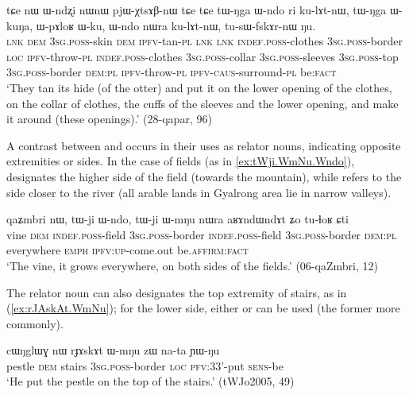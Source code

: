 \begin{exe}
\ex \label{ex:Wndo.ri.kulAtnW}
\gll tɕe nɯ ɯ-ndʐi nɯnɯ pjɯ-χtsɤβ-nɯ tɕe tɕe tɯ-ŋga ɯ-ndo ri ku-lɤt-nɯ, tɯ-ŋga ɯ-kuŋa, ɯ-pɤloʁ ɯ-ku, ɯ-ndo nɯra ku-lɤt-nɯ,  tu-sɯ-fskɤr-nɯ ŋu.   \\
\textsc{lnk} \textsc{dem} \textsc{3sg}.\textsc{poss}-skin \textsc{dem} \textsc{ipfv}-tan-\textsc{pl} \textsc{lnk} \textsc{lnk} \textsc{indef}.\textsc{poss}-clothes \textsc{3sg}.\textsc{poss}-border \textsc{loc} \textsc{ipfv}-throw-\textsc{pl} \textsc{indef}.\textsc{poss}-clothes \textsc{3sg}.\textsc{poss}-collar \textsc{3sg}.\textsc{poss}-sleeves \textsc{3sg}.\textsc{poss}-top \textsc{3sg}.\textsc{poss}-border  \textsc{dem}:\textsc{pl}  \textsc{ipfv}-throw-\textsc{pl} \textsc{ipfv}-\textsc{caus}-surround-\textsc{pl} be:\textsc{fact} \\
\glt `They tan its hide (of the otter) and put it on the lower opening of the clothes, on the collar of clothes, the cuffs of the sleeves and the lower opening, and make it around (these openings).' (28-qapar, 96)
\end{exe} 


A contrast between  and  occurs in their uses as relator nouns, indicating opposite extremities or sides. In the case of fields (as in \ref{ex:tWji.WmNu.Wndo}),  designates the higher side of the field (towards the mountain), while  refers to the side closer to the river (all arable lands in Gyalrong area lie in narrow valleys).

\begin{exe}
\ex \label{ex:tWji.WmNu.Wndo}
\gll  qaʑmbri nɯ, tɯ-ji ɯ-ndo, tɯ-ji ɯ-mŋu nɯra aʁɤndɯndɤt ʑo tu-ɬoʁ ɕti \\
vine \textsc{dem} \textsc{indef}.\textsc{poss}-field \textsc{3sg}.\textsc{poss}-border \textsc{indef}.\textsc{poss}-field \textsc{3sg}.\textsc{poss}-border \textsc{dem}:\textsc{pl} everywhere \textsc{emph} \textsc{ipfv}:\textsc{up}-come.out be.\textsc{affirm}:\textsc{fact} \\
\glt `The vine, it grows everywhere, on both sides of the fields.' (06-qaZmbri, 12)
\end{exe}


The relator noun   can also designates the top extremity of stairs, as in (\ref{ex:rJAskAt.WmNu}); for the lower side, either  or  can be used (the former more commonly).

\begin{exe}
\ex \label{ex:rJAskAt.WmNu}
\gll  cɯŋglɯɣ nɯ rɟɤskɤt ɯ-mŋu zɯ na-ta ɲɯ-ŋu \\
 pestle \textsc{dem} stairs \textsc{3sg}.\textsc{poss}-border \textsc{loc} \textsc{pfv}:3\fl{}3'-put \textsc{sens}-be \\
 \glt `He put the pestle on the top of the stairs.' (tWJo2005, 49)
\end{exe} 

